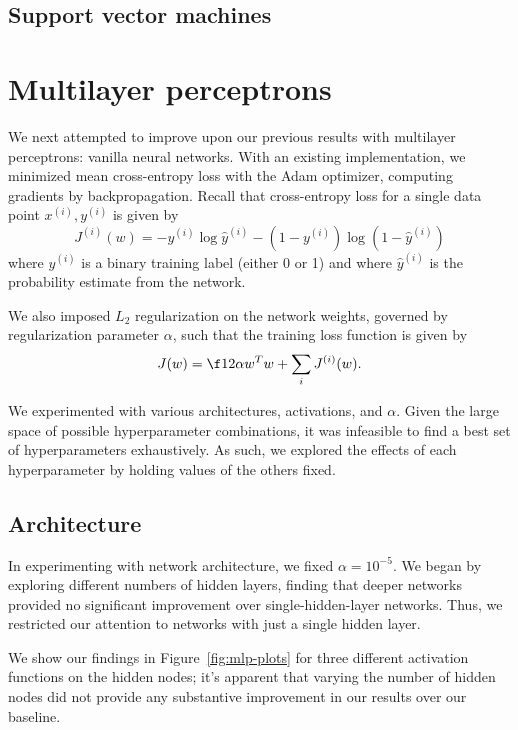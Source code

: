 \documentclass{article}
\newcommand{\sind}[1]{^{(#1)}}
\begin{document}
\begin{multicols}{2}
\subsection{Support vector machines}



\section{Multilayer perceptrons}

We next attempted to improve upon our previous results
with multilayer perceptrons:
vanilla neural networks.
With an existing implementation,
we minimized mean cross-entropy loss with the Adam optimizer,
computing gradients by backpropagation.
Recall that cross-entropy loss for a single data point $x\sind{i}, y\sind{i}$
is given by
\begin{equation}
    J\sind{i}(w) = -y\sind{i}\log\hat y\sind{i} - (1-y\sind{i})\log(1-\hat y\sind{i})
\end{equation}
where $y\sind{i}$ is a binary training label (either 0 or 1)
and where $\hat y\sind{i}$ is the probability estimate from the network.

We also imposed $L_2$ regularization on the network weights,
governed by regularization parameter $\alpha$,
such that the training loss function is given by
\begin{equation}
    J(w) = \f12\alpha w^T w + \sum_i J\sind{i}(w).
\end{equation}

We experimented with various architectures, activations, and $\alpha$.
Given the large space of possible hyperparameter combinations,
it was infeasible to find a best set of hyperparameters exhaustively.
As such,
we explored the effects of each hyperparameter
by holding values of the others fixed.

\subsection{Architecture}

In experimenting with network architecture,
we fixed $\alpha = 10^{-5}$.
We began by exploring different numbers of hidden layers,
finding that deeper networks provided no significant improvement
over single-hidden-layer networks.
Thus, we restricted our attention
to networks with just a single hidden layer.

We show our findings in Figure~\ref{fig:mlp-plots}
for three different activation functions on the hidden nodes;
it's apparent that varying the number of hidden nodes
did not provide any substantive improvement in our results
over our baseline.


\end{multicols}
\end{document}
